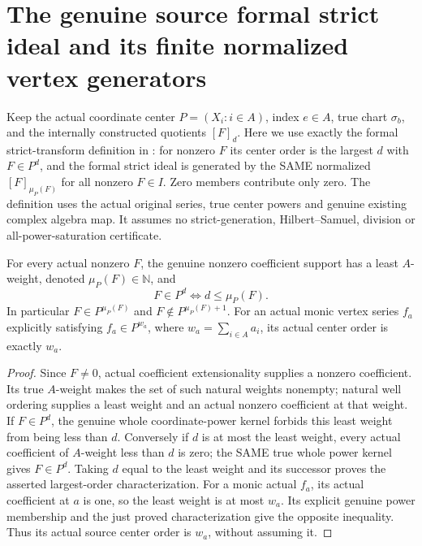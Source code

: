 \section{The genuine source formal strict ideal and its finite normalized vertex generators}

Keep the actual coordinate center $P=(X_i:i\in A)$, index $e\in A$,
true chart $\sigma_b$, and the internally constructed quotients $[F]_d$.
Here we use exactly the formal strict-transform definition in
\cite[\S7, p.~268, followed by Lemma~7.22 and Corollary~7.24]{bierstone-milman97-invent-math}:
for nonzero $F$ its center order is the largest $d$ with $F\in P^d$,
and the formal strict ideal is generated by the SAME normalized
$[F]_{\mu_P(F)}$ for all nonzero $F\in I$. Zero members contribute only zero.
The definition uses the actual original series, true center powers and
genuine existing complex algebra map. It assumes no strict-generation,
Hilbert--Samuel, division or all-power-saturation certificate.

\begin{lemma}
\label{hir:actual-formal-center-order-from-support}
For every actual nonzero $F$, the genuine nonzero coefficient support has
a least $A$-weight, denoted $\mu_P(F)\in\mathbb N$, and
\[
 F\in P^d\Longleftrightarrow d\le\mu_P(F).
\]
In particular $F\in P^{\mu_P(F)}$ and $F\notin P^{\mu_P(F)+1}$.
For an actual monic vertex series $f_a$ explicitly satisfying
$f_a\in P^{w_a}$, where $w_a=\sum_{i\in A}a_i$, its actual center order
is exactly $w_a$.
\leanok
\end{lemma}
\begin{proof}
Since $F\ne0$, actual coefficient extensionality supplies a nonzero
coefficient. Its true $A$-weight makes the set of such natural weights
nonempty; natural well ordering supplies a least weight and an actual
nonzero coefficient at that weight. If $F\in P^d$, the genuine whole
coordinate-power kernel forbids this least weight from being less than
$d$. Conversely if $d$ is at most the least weight, every actual
coefficient of $A$-weight less than $d$ is zero; the SAME true whole
power kernel gives $F\in P^d$. Taking $d$ equal to the least weight
and its successor proves the asserted largest-order characterization.
For a monic actual $f_a$, its actual coefficient at $a$ is one, so the
least weight is at most $w_a$. Its explicit genuine power membership
and the just proved characterization give the opposite inequality.
Thus its actual source center order is $w_a$, without assuming it.
\end{proof}

